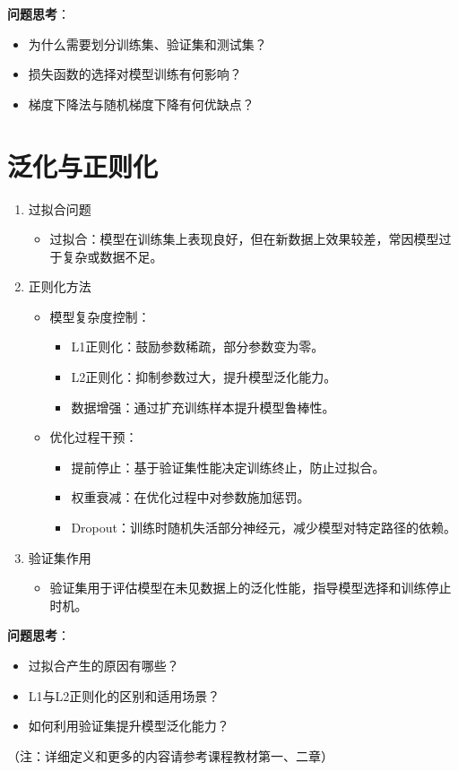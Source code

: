 \documentclass{article}
\theoremstyle{remark}
\theoremstyle{definition}
\theoremstyle{plain}
\numberwithin {equation}{section}
\numberwithin{assumption}{section}
\begin{document}
\textbf{问题思考}：

\begin{itemize}
  \item 为什么需要划分训练集、验证集和测试集？
  \item 损失函数的选择对模型训练有何影响？
  \item 梯度下降法与随机梯度下降有何优缺点？
\end{itemize}


\section{泛化与正则化}

\begin{enumerate}
  \item 过拟合问题
    \begin{itemize}
      \item 过拟合：模型在训练集上表现良好，但在新数据上效果较差，常因模型过于复杂或数据不足。
    \end{itemize}
  \item 正则化方法
    \begin{itemize}
      \item 模型复杂度控制：
        \begin{itemize}
          \item L1正则化：鼓励参数稀疏，部分参数变为零。
          \item L2正则化：抑制参数过大，提升模型泛化能力。
          \item 数据增强：通过扩充训练样本提升模型鲁棒性。
        \end{itemize}
      \item 优化过程干预：
        \begin{itemize}
          \item 提前停止：基于验证集性能决定训练终止，防止过拟合。
          \item 权重衰减：在优化过程中对参数施加惩罚。
          \item Dropout：训练时随机失活部分神经元，减少模型对特定路径的依赖。
        \end{itemize}
    \end{itemize}
  \item 验证集作用
    \begin{itemize}
      \item 验证集用于评估模型在未见数据上的泛化性能，指导模型选择和训练停止时机。
    \end{itemize}
\end{enumerate}

\textbf{问题思考}：

\begin{itemize}
  \item 过拟合产生的原因有哪些？
  \item L1与L2正则化的区别和适用场景？
  \item 如何利用验证集提升模型泛化能力？
\end{itemize}





（注：详细定义和更多的内容请参考课程教材第一、二章）
\end{document}
